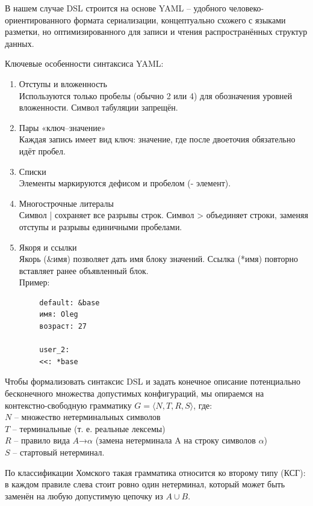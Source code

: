 В нашем случае DSL строится на основе YAML\cite{yaml} – удобного человеко-ориентированного формата сериализации, концептуально схожего с языками разметки, но оптимизированного для записи и чтения распространённых структур данных.


Ключевые особенности синтаксиса YAML:
\begin{enumerate}[1.]
      \item Отступы и вложенность\\
            Используются только пробелы (обычно 2 или 4) для обозначения уровней вложенности. Символ табуляции запрещён.
      \item Пары «ключ–значение»\\
            Каждая запись имеет вид ключ: значение, где после двоеточия обязательно идёт пробел.
      \item Списки\\
            Элементы маркируются дефисом и пробелом (- элемент).
      \item Многострочные литералы\\
            Символ | сохраняет все разрывы строк. Символ > объединяет строки, заменяя отступы и разрывы единичными пробелами.
      \item Якоря и ссылки\\
            Якорь (\&имя) позволяет дать имя блоку значений. Ссылка (*имя) повторно вставляет ранее объявленный блок.\\
            Пример:
\end{enumerate}

\begin{verbatim}
        default: &base
        имя: Oleg
        возраст: 27

        user_2:
        <<: *base
\end{verbatim}
Чтобы формализовать синтаксис DSL и задать конечное описание потенциально
бесконечного множества допустимых конфигураций,
мы опираемся на контекстно-свободную грамматику $G=\langle N,T,R,S\rangle$, где:\\
$N$ – множество нетерминальных символов \\
$T$ – терминальные (т. е. реальные лексемы) \\
$R$ – правило вида $A$→$\alpha$ (замена нетерминала A на строку символов $\alpha$) \\
$S$ – стартовый нетерминал.

По классификации Хомского такая грамматика относится ко второму типу (КСГ): в каждом правиле слева стоит ровно один нетерминал, который может быть заменён на любую допустимую цепочку из  $A\cup B$.

